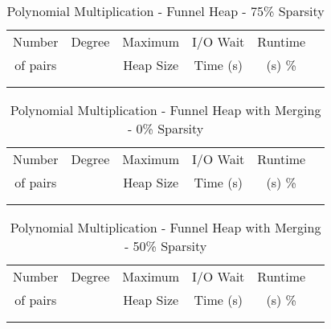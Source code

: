 \documentclass[11pt, one-sided]{amsart}
\begin{document}
\begin{table}[htbp]
   \centering
      \caption{Polynomial Multiplication - Funnel Heap - 75\% Sparsity}
   \begin{tabular}{|c|c|c|c|c|c|}
   	\hline
		 Number   & 	Degree	& Maximum & I/O Wait		& Runtime 	 \\ 
		 of pairs 	&			& Heap Size	& Time (s)		&	(s)		 		\%				\\ \hline
		 		&			&			&			&						\\
		 		&			&			&			&						\\
   \end{tabular}
   \label{tab:booktabs}
\end{table}



\newpage


\begin{table}[htbp]
   \centering
      \caption{Polynomial Multiplication - Funnel Heap with Merging - 0\% Sparsity}
   \begin{tabular}{|c|c|c|c|c|c|}
   	\hline
		 Number   & 	Degree	& Maximum & I/O Wait		&  Runtime  \\ 
		 of pairs 	&			& Heap Size	& Time (s)		&	(s)	 		\%				\\ \hline
		 		&			&			&			&					\\
		 		&			&			&			&					\\
   \end{tabular}
   \label{tab:booktabs}
\end{table}

\begin{table}[htbp]
   \centering
      \caption{Polynomial Multiplication - Funnel Heap with Merging - 50\% Sparsity}
   \begin{tabular}{|c|c|c|c|c|c|}
   	\hline
		 Number   & 	Degree	& Maximum & 	I/O Wait	&  Runtime 	 \\ 
		 of pairs 	&			& Heap Size	& 	Time (s)		&	(s)	 		\%				\\ \hline
		 		&			&			&			&						\\
		 		&			&			&			&						\\
   \end{tabular}
   \label{tab:booktabs}
\end{table}
\end{document}
